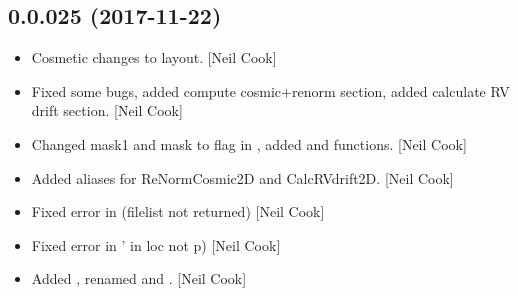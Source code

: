 \documentclass[a4paper,10pt,english]{report}
\begin{document}
\subsection{0.0.025 (2017-11-22)}
\label{\detokenize{misc/changelog:id527}}\begin{itemize}
\item {} 
Cosmetic changes to layout. {[}Neil Cook{]}

\item {} 
Fixed some bugs, added compute cosmic+renorm section, added calculate
RV drift section. {[}Neil Cook{]}

\item {} 
Changed mask1 and mask to flag in , added
 and  functions. {[}Neil Cook{]}

\item {} 
Added aliases for ReNormCosmic2D and CalcRVdrift2D. {[}Neil Cook{]}

\item {} 
Fixed error in  (filelist not returned) {[}Neil
Cook{]}

\item {} 
Fixed error in  ’ in loc
not p) {[}Neil Cook{]}

\item {} 
Added , renamed  and . {[}Neil
Cook{]}

\end{itemize}
\end{document}
